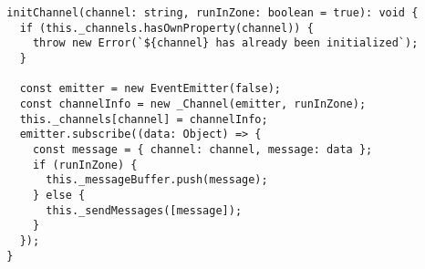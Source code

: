 \begin{verbatim}
  initChannel(channel: string, runInZone: boolean = true): void {
    if (this._channels.hasOwnProperty(channel)) {
      throw new Error(`${channel} has already been initialized`);
    }

    const emitter = new EventEmitter(false);
    const channelInfo = new _Channel(emitter, runInZone);
    this._channels[channel] = channelInfo;
    emitter.subscribe((data: Object) => {
      const message = { channel: channel, message: data };
      if (runInZone) {
        this._messageBuffer.push(message);
      } else {
        this._sendMessages([message]);
      }
    });
  }
\end{verbatim}
